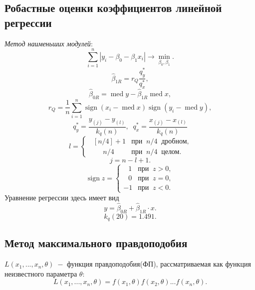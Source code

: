 \documentclass[a4paper,12pt]{article} %
\DeclareMathOperator{\med}{med}
\DeclareMathOperator{\sign}{sign}
\begin{document}
\subsection{Робастные оценки коэффициентов линейной регрессии}
\textit{Метод наименьших модулей}:
\begin{equation}
    \sum_{i=1}^n |y_i-\beta_0-\beta_1 x_i|\to \min_{\beta_0,\beta_1}.
\end{equation}
\begin{equation}
    \widehat{\beta}_{1R}=r_Q\frac{q_y^*}{q_x^*},
\end{equation}
\begin{equation}
    \widehat{\beta}_{0R}=\med{y}-\widehat{\beta}_{1R}\med{x},
\end{equation}
\begin{equation}
    r_Q=\frac{1}{n}\sum_{i=1}^n \sign{(x_i-\med{x})}\sign{(y_i-\med{y})},
\end{equation}
\begin{equation}
    q_y^*=\frac{y_{(j)}-y_{(l)}}{k_q(n)},\;\;q_x^*=\frac{x_{(j)}-x_{(l)}}{k_q(n)}
\end{equation}
\begin{equation*}
    l=\begin{cases}
        \displaystyle\;\;[n/4]+1&\text{при}\;\;n/4\;\;\text{дробном,}\\
        \displaystyle\;\;\;\;\;\;\;n/4&\text{при}\;\;n/4\;\;\text{целом}.
    \end{cases}
\end{equation*}
\begin{equation*}
    j=n-l+1.
\end{equation*}
\begin{equation*}
    \sign{z} = \begin{cases}
    \;\:\:1&\text{при}\;\;z>0,\\
    \;\:\:0&\text{при}\;\;z=0,\\
    -1&\text{при}\;\;z<0.
    \end{cases}
\end{equation*}
Уравнение регрессии здесь имеет вид
\begin{equation}
    y = \widehat{\beta}_{0R}+\widehat{\beta}_{1R}\cdot x.
\end{equation}
\begin{equation*}
    k_q(20)=1.491.
\end{equation*}
\subsection{Метод максимального правдоподобия}
$L(x_1,...,x_n,\theta)\;-$ функция правдоподобия(ФП), рассматриваемая как функция неизвестного параметра $\theta$:
\begin{equation}
    L(x_1,...,x_n,\theta)=f(x_1,\theta)f(x_2,\theta)...f(x_n,\theta).
\end{equation}
\end{document}
